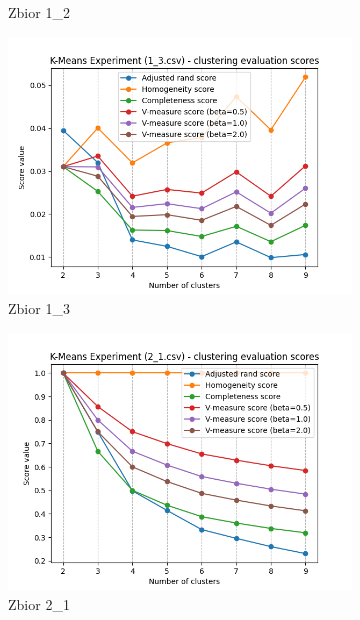 \documentclass[12pt]{article}
\begin{document}
\begin{figure}[H]
\begin{subfigure}[b]{0.3\textwidth}
        \caption{Zbior 1\_2}
    \end{subfigure}
    \hfill
    \begin{subfigure}[b]{0.3\textwidth}
        \includegraphics[width=\linewidth]{img/exp_2/kmeans/1_3_scores.png}
        \caption{Zbior 1\_3}
    \end{subfigure}
    \begin{subfigure}[b]{0.3\textwidth}
        \includegraphics[width=\linewidth]{img/exp_2/kmeans/2_1_scores.png}
        \caption{Zbior 2\_1}
    \end{subfigure}
    \hfill
    \begin{subfigure}[b]{0.3\textwidth}

\end{subfigure}
\end{figure}
\end{document}
